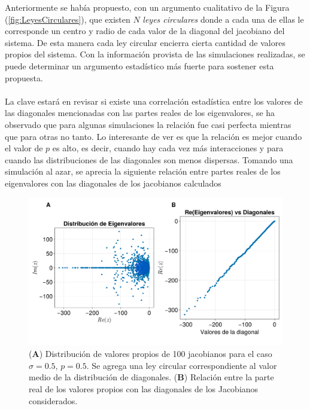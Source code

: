\documentclass[a4paper,11pt]{book}
\theoremstyle{plain}
\theoremstyle{definition}
\begin{document}
Anteriormente se había propuesto, con un argumento cualitativo de la Figura (\ref{fig:LeyesCirculares}), que existen $N$ \textit{leyes circulares} donde a cada una de ellas le corresponde un centro y radio de cada valor de la diagonal del jacobiano del sistema. De esta manera cada ley circular encierra cierta cantidad de valores propios del sistema. Con la información provista de las simulaciones realizadas, se puede determinar un argumento estadístico más fuerte para sostener esta propuesta. \\
\\
La clave estará en revisar si existe una correlación estadística entre los valores de las diagonales mencionadas con las partes reales de los eigenvalores, se ha observado que para algunas simulaciones la relación fue casi perfecta mientras que para otras no tanto. Lo interesante de ver es que la relación es mejor cuando el valor de $p$ es alto, es decir, cuando hay cada vez más interacciones y para cuando las distribuciones de las diagonales son menos dispersas. Tomando una simulación al azar, se aprecia la siguiente relación entre partes reales de los eigenvalores con las diagonales de los jacobianos calculados
\begin{figure}[h!]
	\centering
	\includegraphics[scale=0.2]{../Imagenes/ReEvs-Diagonales}
	\caption{(\textbf{A}) Distribución de valores propios de 100 jacobianos para el caso $\sigma=0.5$, $p=0.5$. Se agrega una ley circular correspondiente al valor medio de la distribución de diagonales. (\textbf{B}) Relación entre la parte real de los valores propios con las diagonales de los Jacobianos considerados.}
	\label{fig:ReEvs-Diagonales}
\end{figure}
\end{document}
